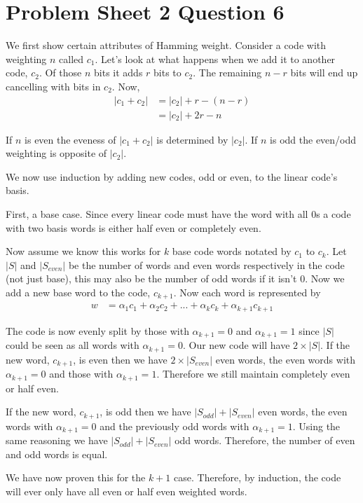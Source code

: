 \documentclass{article}
\begin{document}
\section{Problem Sheet 2 Question 6}
We first show certain attributes of Hamming weight.
Consider a code with weighting $n$ called $c_1$. Let's look at what happens
when we add it to another code, $c_2$.
Of those $n$ bits it adds $r$ bits to $c_2$.
The remaining $n-r$ bits will end up cancelling with bits in $c_2$.
Now,
\begin{align*}
    |c_1 + c_2| &= |c_2| + r - (n - r) \\
    &= |c_2| + 2r - n
\end{align*}

If $n$ is even the eveness of $|c_1 + c_2|$ is determined by $|c_2|$.
If $n$ is odd the even/odd weighting is opposite of $|c_2|$.

We now use induction by adding new codes, odd or even, to the
linear code's basis.

First, a base case. Since every linear code must have the word with all 0s
a code with two basis words is either half even or completely even.

Now assume we know this works for $k$ base code words
notated by $c_1$ to $c_k$. Let $|S|$ and $|S_{even}|$ be the number
of words and  even words respectively in the code (not just base),
this may also be the number of odd words if it isn't 0.
Now we add a new base word to the code, $c_{k+1}$.
Now each word is represented by
\begin{align*}
    w &= \alpha_1 c_1 + \alpha_2 c_2 + ... + \alpha_k c_k
    + \alpha_{k+1} c_{k+1}
\end{align*}

The code is now evenly split by those with $\alpha_{k+1} = 0$
and $\alpha_{k+1} = 1$ since $|S|$ could be seen as all words with
$\alpha_{k+1} = 0$. Our new code will have $2\times|S|$.
If the new word, $c_{k+1}$, is even then we have $2\times|S_{even}|$ even
words, the even words with $\alpha_{k+1} = 0$
and those with $\alpha_{k+1} = 1$.
Therefore we still maintain completely even or half even.

If the new word, $c_{k+1}$, is odd then we have $|S_{odd}| + |S_{even}|$ even
words, the even
words with $\alpha_{k+1} = 0$ and the previously odd words
with $\alpha_{k+1} = 1$. Using the same reasoning we have
$|S_{odd}| + |S_{even}|$ odd words. Therefore, the number of even and odd words
is equal.

We have now proven this for the $k+1$ case. Therefore, by induction, the
code will ever only have all even or half even weighted words.
\end{document}
